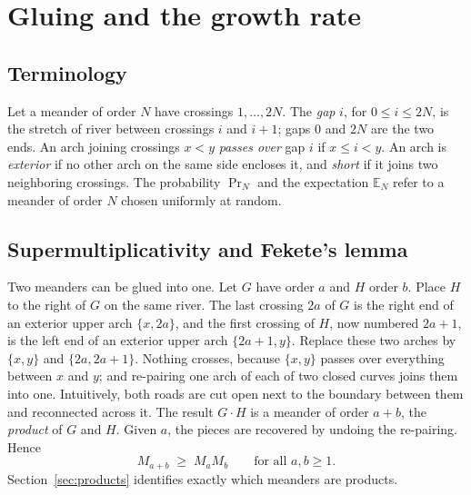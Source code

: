 \section{Gluing and the growth rate}\label{sec:growth}

\subsection{Terminology}

Let a meander of order $N$ have crossings $1,\ldots,2N$. The \emph{gap} $i$, for $0\le i\le 2N$, is
the stretch of river between crossings $i$ and $i+1$; gaps $0$ and $2N$ are the two ends. An arch
joining crossings $x<y$ \emph{passes over} gap $i$ if $x\le i<y$. An arch is \emph{exterior} if no
other arch on the same side encloses it, and \emph{short} if it joins two neighboring crossings.
The probability $\Pr_N$ and the expectation $\mathbb E_N$ refer to a meander of order $N$ chosen
uniformly at random.

\subsection{Supermultiplicativity and Fekete's lemma}

Two meanders can be glued into one. Let $G$ have order $a$ and $H$ order $b$. Place $H$ to the right
of $G$ on the same river. The last crossing $2a$ of $G$ is the right end of an exterior upper arch
$\{x,2a\}$, and the first crossing of $H$, now numbered $2a+1$, is the left end of an exterior upper
arch $\{2a+1,y\}$. Replace these two arches by $\{x,y\}$ and $\{2a,2a+1\}$. Nothing crosses, because
$\{x,y\}$ passes over everything between $x$ and $y$; and re-pairing one arch of each of two closed
curves joins them into one. Intuitively, both roads are cut open next to the boundary between them
and reconnected across it. The result $G\cdot H$ is a meander of order $a+b$, the \emph{product} of
$G$ and $H$. Given $a$, the pieces are recovered by undoing the re-pairing. Hence
\begin{equation}\label{eq:supermult}
M_{a+b}\;\ge\;M_aM_b\qquad\text{for all }a,b\ge1 .
\end{equation}
Section~\ref{sec:products} identifies exactly which meanders are products.

